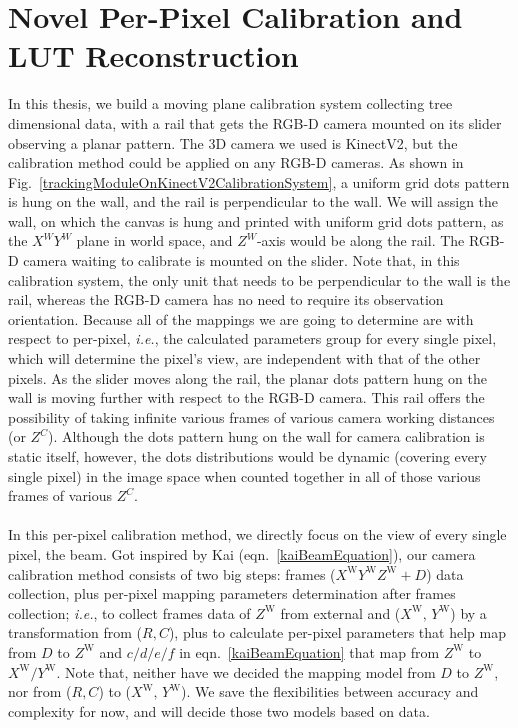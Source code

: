 \section{Novel Per-Pixel Calibration and LUT Reconstruction}
In this thesis, we build a moving plane calibration system collecting tree dimensional data, with a rail that gets the RGB-D camera mounted on its slider observing a planar pattern. The 3D camera we used is KinectV2, but the calibration method could be applied on any RGB-D cameras. As shown in Fig.~\ref{trackingModuleOnKinectV2CalibrationSystem}, a uniform grid dots pattern is hung on the wall, and the rail is perpendicular to the wall. We will assign the wall, on which the canvas is hung and printed with uniform grid dots pattern, as the \(X^WY^W\) plane in world space, and \(Z^W\)-axis would be along the rail. The RGB-D camera waiting to calibrate is mounted on the slider. Note that, in this calibration system, the only unit that needs to be perpendicular to the wall is the rail, whereas the RGB-D camera has no need to require its observation orientation. Because all of the mappings we are going to determine are with respect to per-pixel, \textit{i.e.}, the calculated parameters group for every single pixel, which will determine the pixel's view, are independent with that of the other pixels. As the slider moves along the rail, the planar dots pattern hung on the wall is moving further with respect to the RGB-D camera. This rail offers the possibility of taking infinite various frames of various camera working distances (or \(Z^C\)). Although the dots pattern hung on the wall for camera calibration is static itself, however, the dots distributions would be dynamic (covering every single pixel) in the image space when counted together in all of those various frames of various \(Z^C\). 
\\\\\indent%
In this per-pixel calibration method, we directly focus on the view of every single pixel, the beam. Got inspired by Kai (eqn.~\ref{kaiBeamEquation}), our camera calibration method consists of two big steps: frames (\(X^\text{W}Y^\text{W}Z^\text{W}+D\)) data collection, plus per-pixel mapping parameters determination after frames collection; \textit{i.e.}, to collect frames data of \(Z^\text{W}\) from external and (\(X^\text{W}, \, Y^\text{W}\)) by a transformation from (\(R, C\)), plus to calculate per-pixel parameters that help map from \(D\) to \(Z^\text{W}\) and \(c/d/e/f\) in eqn.~\ref{kaiBeamEquation} that map from \(Z^\text{W}\) to \(X^\text{W}/Y^\text{W}\). Note that, neither have we decided the mapping model from \(D\) to \(Z^\text{W}\), nor from (\(R, C\)) to (\(X^\text{W}, \, Y^\text{W}\)). We save the flexibilities between accuracy and complexity for now, and will decide those two models based on data.
